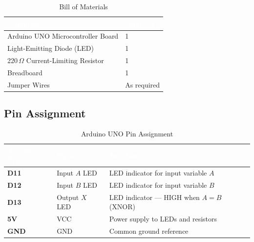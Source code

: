 \documentclass[12pt,a4paper]{article}
\begin{document}
\begin{table}[H]
\centering
\vspace{0.07cm}
\caption{Bill of Materials}
\vspace{0.07cm}
\renewcommand{\arraystretch}{1.4}
\begin{tabular}{L{6cm} C{3cm}}
\toprule
{}
\textcolor{white}{\textbf{Component}} &
\textcolor{white}{\textbf{Quantity}} \\
\midrule
Arduino UNO Microcontroller Board & 1 \\
Light-Emitting Diode (LED)         & 1 \\
220\,$\Omega$ Current-Limiting Resistor & 1 \\
Breadboard                         & 1 \\
Jumper Wires                       & As required \\
\bottomrule
\end{tabular}
\end{table}

\subsection{Pin Assignment}

\begin{table}[H]
\centering

\caption{Arduino UNO Pin Assignment}
\vspace{0.07cm}
\renewcommand{\arraystretch}{1.4}
\begin{tabular}{C{2.5cm} C{2.5cm} L{6.5cm}}
\toprule
{}
\textcolor{white}{\textbf{Arduino Pin}} &
\textcolor{white}{\textbf{Signal}} &
\textcolor{white}{\textbf{Function}} \\
\midrule
\textcolor{accentblue}{\textbf{D11}} & Input $A$ LED  & LED indicator for input variable $A$ \\
\textcolor{accentblue}{\textbf{D12}} & Input $B$ LED  & LED indicator for input variable $B$ \\
\textcolor{accentblue}{\textbf{D13}} & Output $X$ LED & LED indicator --- HIGH when $A = B$ (XNOR) \\
\textcolor{accentblue}{\textbf{5V}}  & VCC            & Power supply to LEDs and resistors \\
\textcolor{accentblue}{\textbf{GND}} & GND            & Common ground reference \\
\bottomrule
\end{tabular}
\end{table}
\end{document}
